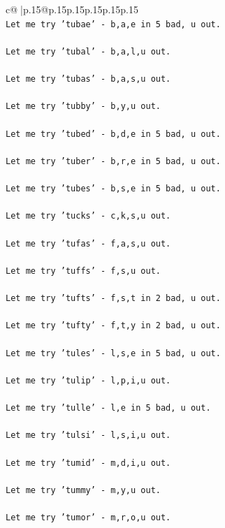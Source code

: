 \documentclass{article}
\begin{document}
{\begin{supertabular}{c@{$\;$}|p{.15\linewidth}@{}p{.15\linewidth}p{.15\linewidth}p{.15\linewidth}p{.15\linewidth}p{.15\linewidth}}
{{{\\ 
\texttt{Let me try 'tubae' {-} b,a,e in 5 bad, u out. } \\
\\ 
\texttt{Let me try 'tubal' {-} b,a,l,u out. } \\
\\ 
\texttt{Let me try 'tubas' {-} b,a,s,u out. } \\
\\ 
\texttt{Let me try 'tubby' {-} b,y,u out. } \\
\\ 
\texttt{Let me try 'tubed' {-} b,d,e in 5 bad, u out. } \\
\\ 
\texttt{Let me try 'tuber' {-} b,r,e in 5 bad, u out. } \\
\\ 
\texttt{Let me try 'tubes' {-} b,s,e in 5 bad, u out. } \\
\\ 
\texttt{Let me try 'tucks' {-} c,k,s,u out. } \\
\\ 
\texttt{Let me try 'tufas' {-} f,a,s,u out. } \\
\\ 
\texttt{Let me try 'tuffs' {-} f,s,u out. } \\
\\ 
\texttt{Let me try 'tufts' {-} f,s,t in 2 bad, u out. } \\
\\ 
\texttt{Let me try 'tufty' {-} f,t,y in 2 bad, u out. } \\
\\ 
\texttt{Let me try 'tules' {-} l,s,e in 5 bad, u out. } \\
\\ 
\texttt{Let me try 'tulip' {-} l,p,i,u out. } \\
\\ 
\texttt{Let me try 'tulle' {-} l,e in 5 bad, u out. } \\
\\ 
\texttt{Let me try 'tulsi' {-} l,s,i,u out. } \\
\\ 
\texttt{Let me try 'tumid' {-} m,d,i,u out. } \\
\\ 
\texttt{Let me try 'tummy' {-} m,y,u out. } \\
\\ 
\texttt{Let me try 'tumor' {-} m,r,o,u out. } \\
\\ 
}}}
\end{supertabular}}
\end{document}

